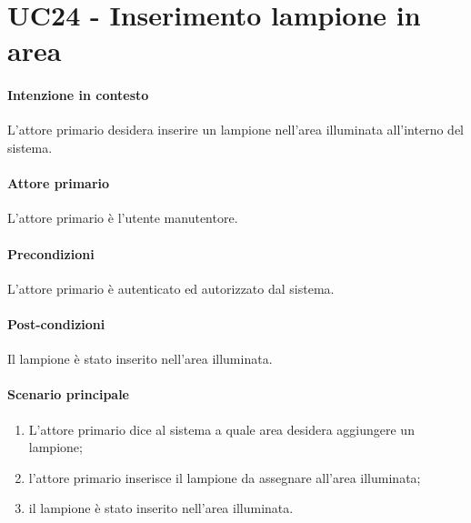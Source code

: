 \section{UC24 - Inserimento lampione in area}\label{uc:24}
\paragraph{Intenzione in contesto} L'attore primario desidera inserire un lampione nell'area illuminata all'interno del sistema.
\paragraph{Attore primario} L'attore primario è l'utente manutentore.
\paragraph{Precondizioni}  L'attore primario è autenticato ed autorizzato dal sistema.
\paragraph{Post-condizioni} Il lampione è stato inserito nell'area illuminata.
\paragraph{Scenario principale}
\begin{enumerate}
    \item L'attore primario dice al sistema a quale area desidera aggiungere un lampione;
    \item l'attore primario inserisce il lampione da assegnare all'area illuminata;
    \item il lampione è stato inserito nell'area illuminata.
\end{enumerate}